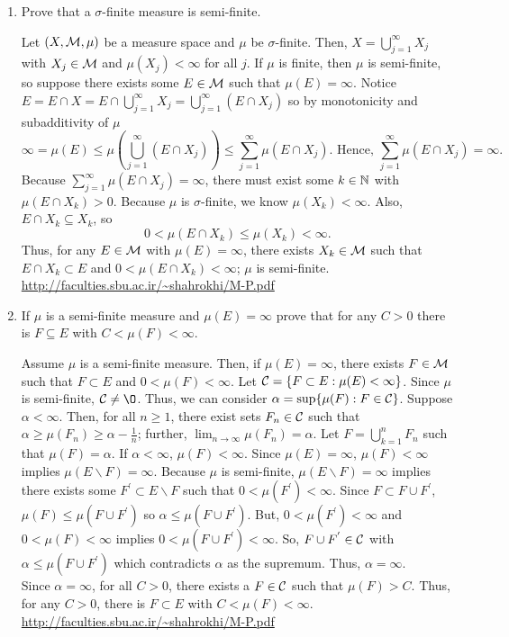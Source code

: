 \begin{enumerate}
\item Prove that a $\sigma$-finite measure is semi-finite.  
	\begin{pf}
Let $(X, {\mathcal M}, \mu)$ be a measure space and $\mu$ be $\sigma$-finite. Then, $X= \bigcup_{j=1}^\infty X_j$ with $X_j \in {\mathcal M}$ and $\mu(X_j) < \infty$ for all $j$.  If $\mu$ is finite, then $\mu$ is semi-finite, so suppose there exists some $E \in {\mathcal M}$ such that $\mu(E)=\infty$. Notice $E = E \cap X = E \cap \bigcup_{j=1}^\infty X_j = \bigcup_{j=1}^\infty (E \cap X_j)$ so by monotonicity and subadditivity of $\mu$
\[
\infty = \mu(E) \leq \mu \left(\bigcup_{j=1}^\infty (E \cap X_j)\right) \leq \sum_{j = 1}^ \infty \mu(E \cap X_j). \text{ Hence, } \sum_{j = 1}^ \infty \mu(E \cap X_j)= \infty. 
\]
Because $\sum_{j = 1}^ \infty \mu(E \cap X_j)= \infty$, there must exist some $k \in {\mathbb N}$ with $\mu(E \cap X_k)>0$. Because $\mu$ is $\sigma$-finite, we know $\mu(X_k) < \infty$. Also, $E \cap X_k \subseteq X_k$, so 
\[
0 < \mu(E \cap X_k) \leq \mu(X_k) < \infty. 
\]
Thus, for any $E \in {\mathcal M}$ with $\mu(E) = \infty$, there exists $X_k \in {\mathcal M}$ such that $E \cap X_k \subset E$ and $0 < \mu(E \cap X_k) < \infty$; $\mu$ is semi-finite. 
\\
\url{http://faculties.sbu.ac.ir/~shahrokhi/M-P.pdf}
\end{pf}

\item If $\mu$ is a semi-finite measure and $\mu(E)=\infty$ prove that for any $C>0$ there is $F \subseteq E$ with $C<\mu(F)<\infty$.
\begin{pf}
Assume $\mu$ is a semi-finite measure. Then, if $\mu(E)= \infty$, there exists $F\in {\mathcal M}$ such that $F \subset E$ and $0 < \mu(F) < \infty$. Let ${\mathcal C} = \{F \subset E : \mu(E)< \infty \}$. Since $\mu$ is semi-finite, $\C \neq \O$. Thus, we can consider $\alpha = \sup \{\mu(F) : F\in {\mathcal C}\}$. Suppose $\alpha<\infty$. Then, for all $n \geq 1$, there exist sets $F_n \in {\mathcal C}$ such that $\alpha \geq \mu(F_n) \geq \alpha-\frac{1}{n}$; further, $\lim_{n\rightarrow \infty}\mu(F_n)=\alpha$. Let $F=\bigcup_{k=1}^nF_n$ such that $\mu(F)=\alpha$.  If $\alpha<\infty$, $\mu(F)< \infty$. Since $\mu(E)=\infty$, $\mu(F)< \infty$ implies $\mu(E\backslash F)= \infty$. Because $\mu$ is semi-finite, $\mu(E\backslash F)= \infty$ implies there exists some $F^{'}\subset E\backslash F$ such that $0<\mu(F^{'})<\infty$. Since $F \subset F \cup F^{'}$, $\mu(F)\leq \mu(F\cup F^{'})$ so $\alpha \leq \mu(F \cup F^{'})$. But, $0<\mu(F^{'})<\infty$ and $0<\mu(F)<\infty$ implies $0<\mu(F\cup F^{'})<\infty$. So, $F \cup F^{'} \in {\mathcal C}$ with $\alpha \leq \mu(F\cup F^{'})$ which contradicts $\alpha$ as the supremum. Thus, $\alpha = \infty$. \\
Since $\alpha=\infty$, for all $C>0$, there exists a $F \in {\mathcal C}$ such that $\mu(F)>C$. Thus, for any $C>0$, there is $F \subset E$ with $C<\mu(F)<\infty$. 
\\
	\url{http://faculties.sbu.ac.ir/~shahrokhi/M-P.pdf}
\end{pf}
\end{enumerate}